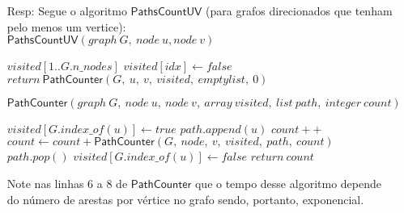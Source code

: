 \documentclass{homework}
\begin{document}
	\begin{enumerate}
		\item[Resp:] Segue o algoritmo $\mathsf{PathsCountUV}$ (para grafos direcionados que tenham pelo menos um vertice):\\
			$\mathsf{PathsCountUV}(graph\ G,\ node\ u, node\ v)$
			\begin{algorithmic}[1]
			    \State $visited[1..G.n\_nodes]$
			        \State $visited[idx] \gets false$
			    \EndFor
			    \State $return\ \mathsf{PathCounter}(G,\ u,\ v,\ visited,\ emptylist,\ 0)$
			\end{algorithmic}
			$\mathsf{PathCounter}(graph\ G,\ node\ u,\ node\ v,\ array\ visited,\ list\ path,\ integer\ count)$
			\begin{algorithmic}[1]
			    \State $visited[G.index\_of(u)] \gets true$
			    \State $path.append(u)$
			        \State $count++$
			    \Else
			                \State $count \gets count + \mathsf{PathCounter}(G,\ node,\ v,\ visited,\ path,\ count)$
			            \EndIf
			        \EndFor
			    \EndIf
			    \State $path.pop()$
			    \State $visited[G.index\_of(u)] \gets false$
			    \State $return\ count$
			\end{algorithmic}
			Note nas linhas 6 a 8 de $\mathsf{PathCounter}$ que o tempo desse algoritmo depende do número de arestas por vértice no grafo sendo, portanto, exponencial.
    \end{enumerate}
    
\end{document}
